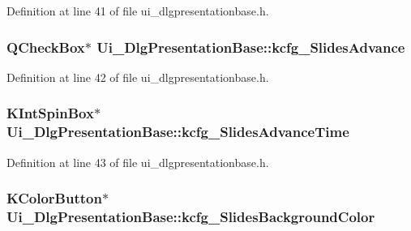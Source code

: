 Definition at line 41 of file ui\+\_\+dlgpresentationbase.\+h.

\hypertarget{classUi__DlgPresentationBase_a0c1bde315c60ff1727e7b00df3523775}{
\subsubsection[{kcfg\+\_\+\+Slides\+Advance}]{\setlength{\rightskip}{0pt plus 5cm}Q\+Check\+Box$\ast$ Ui\+\_\+\+Dlg\+Presentation\+Base\+::kcfg\+\_\+\+Slides\+Advance}}\label{classUi__DlgPresentationBase_a0c1bde315c60ff1727e7b00df3523775}


Definition at line 42 of file ui\+\_\+dlgpresentationbase.\+h.

\hypertarget{classUi__DlgPresentationBase_aba7f1b1ba7c742636c1f2e306001cb3a}{
\subsubsection[{kcfg\+\_\+\+Slides\+Advance\+Time}]{\setlength{\rightskip}{0pt plus 5cm}K\+Int\+Spin\+Box$\ast$ Ui\+\_\+\+Dlg\+Presentation\+Base\+::kcfg\+\_\+\+Slides\+Advance\+Time}}\label{classUi__DlgPresentationBase_aba7f1b1ba7c742636c1f2e306001cb3a}


Definition at line 43 of file ui\+\_\+dlgpresentationbase.\+h.

\hypertarget{classUi__DlgPresentationBase_aecb1ed8002c11e492aefffaf85263982}{
\subsubsection[{kcfg\+\_\+\+Slides\+Background\+Color}]{\setlength{\rightskip}{0pt plus 5cm}K\+Color\+Button$\ast$ Ui\+\_\+\+Dlg\+Presentation\+Base\+::kcfg\+\_\+\+Slides\+Background\+Color}}\label{classUi__DlgPresentationBase_aecb1ed8002c11e492aefffaf85263982}


